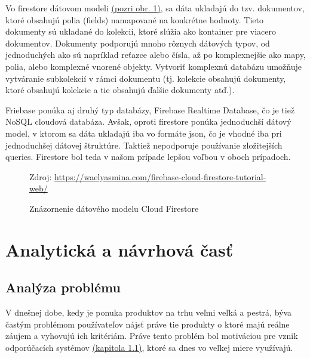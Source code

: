 Vo firestore dátovom modeli \hyperref[firestore]{(pozri obr. \ref{firestore})}, sa dáta ukladajú do tzv. dokumentov, ktoré obsahujú polia (fields) namapované na konkrétne hodnoty. Tieto dokumenty sú ukladané do kolekcií, ktoré slúžia ako kontainer pre viacero dokumentov. Dokumenty podporujú mnoho rôznych dátových typov, od jednoduchých ako sú napríklad reťazce alebo čísla, až po komplexnejšie ako mapy, polia, alebo komplexné vnorené objekty. Vytvoriť komplexnú databázu umožňuje vytváranie subkolekcií v rámci dokumentu (tj. kolekcie obsahujú dokumenty, ktoré obsahujú kolekcie a tie obsahujú ďalšie dokumenty atď.). \cite{firestoredoc}

Friebase ponúka aj druhý typ databázy, Firebase Realtime Database, čo je tiež NoSQL cloudová databáza. Avšak, oproti firestore ponúka jednoduchší dátový model, v ktorom sa dáta ukladajú iba vo formáte \acrshort{json}, čo je vhodné iba pri jednoduchšej dátovej štruktúre. Taktiež nepodporuje používanie zložitejších queries. Firestore bol teda v našom prípade lepšou voľbou v oboch prípadoch. \\

\begin{figure}[!htbp]
  \centering  
  \def\stackalignment{c}
           {\scriptsize%
            Zdroj: \url{https://waelyasmina.com/firebase-cloud-firestore-tutorial-web/}}
	\caption{Znázornenie dátového modelu Cloud Firestore}  
  \label{firestore}
\end{figure}




\section{Analytická a návrhová časť}
\subsection{Analýza problému}
V dnešnej dobe, kedy je ponuka produktov na trhu veľmi veľká a pestrá, býva častým problémom používateľov nájsť práve tie produkty o ktoré majú reálne záujem a vyhovujú ich kritériám. Práve tento problém bol motiváciou pre vznik odporúčacích systémov \hyperref[sec:odporucacie systemy]{(kapitola 1.1)}, ktoré sa dnes vo veľkej miere využívajú. 

